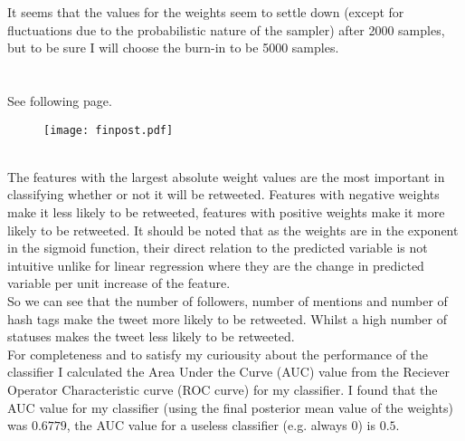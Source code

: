 \documentclass[paper=a4, fontsize=11pt]{scrartcl} %
\numberwithin{equation}{section} %
\numberwithin{figure}{section} %
\numberwithin{table}{section} %
\begin{document}
It seems that the values for the weights seem to settle down (except for fluctuations due to the probabilistic nature of the sampler) after 2000 samples, but to be sure I will choose the burn-in to be 5000 samples.\\

\\
\\
See following page.
\newpage


\begin{figure}[!h]
\centering
\texttt{[image: finpost.pdf]}%
\end{figure}

\clearpage

\\
The features with the largest absolute weight values are the most important in classifying whether or not it will be retweeted. Features with negative weights make it less likely to be retweeted, features with positive weights make it more likely to be retweeted. It should be noted that as the weights are in the exponent in the sigmoid function, their direct relation to the predicted variable is not intuitive unlike for linear regression where they are the change in predicted variable per unit increase of the feature.\\

So we can see that the number of followers, number of mentions and number of hash tags make the tweet more likely to be retweeted. Whilst a high number of statuses makes the tweet less likely to be retweeted.\\


For completeness and to satisfy my curiousity about the performance of the classifier I calculated the Area Under the Curve (AUC) value from the Reciever Operator Characteristic curve (ROC curve) for my classifier. I found that the AUC value for my classifier (using the final posterior mean value of the weights) was $0.6779$, the AUC value for a useless classifier (e.g. always 0) is $0.5$.\\
\end{document}
